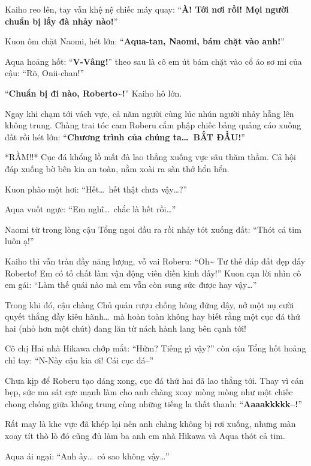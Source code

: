 \documentclass[../main.tex]{subfiles}
\begin{document}

Kaiho reo lên, tay vẫn khệ nệ chiếc máy quay: ``\textbf{À! Tới nơi rồi! Mọi người chuẩn bị lấy đà nhảy nào!}''

Kuon ôm chặt Naomi, hét lớn: ``\textbf{Aqua-tan, Naomi, bám chặt vào anh!}''

Aqua hoảng hốt: ``\textbf{V-Vâng!}'' theo sau là cô em út bám chặt vào cổ áo sơ mi của cậu: ``Rõ, Onii-chan!''

“\textbf{Chuẩn bị đi nào, Roberto\~{}!}” Kaiho hô lớn.

Ngay khi chạm tới vách vực, cả năm người cùng lúc nhún người nhảy hẫng lên không trung. Chàng trai tóc cam Roberu cắm phập chiếc bảng quảng cáo xuống đất rồi hét lớn: ``\textbf{Chương trình của chúng ta\dots\ BẮT ĐẦU!}''


*RẦM!!* Cục đá khổng lồ mất đà lao thẳng xuống vực sâu thăm thẳm. Cả hội đáp xuống bờ bên kia an toàn, nằm xoài ra sàn thở hổn hển.

Kuon phào một hơi: ``Hết\dots\ hết thật chưa vậy\dots?''

Aqua vuốt ngực: ``Em nghĩ\dots\ chắc là hết rồi\dots''

Naomi từ trong lòng cậu Tổng ngoi đầu ra rồi nhảy tót xuống đất: ``Thót cả tim luôn ạ!''

Kaiho thì vẫn tràn đầy năng lượng, vỗ vai Roberu: ``Oh\~{} Tư thế đáp đất đẹp đấy Roberto! Em có tố chất làm vận động viên điền kinh đấy!'' Kuon cạn lời nhìn cô em gái: ``Làm thế quái nào mà em vẫn còn sung sức được hay vậy\dots''

Trong khi đó, cậu chàng Chủ quán rượu chống hông đứng dậy, nở một nụ cười quyết thắng đầy kiêu hãnh\dots\ mà hoàn toàn không hay biết rằng một cục đá thứ hai (nhỏ hơn một chút) đang lăn từ nách hành lang bên cạnh tới!

Cô chị Hai nhà Hikawa chớp mắt: ``Hửm? Tiếng gì vậy?'' còn cậu Tổng hốt hoảng chỉ tay: ``N-Này cậu kia ơi! Cái cục đá--''

Chưa kịp để Roberu tạo dáng xong, cục đá thứ hai đã lao thẳng tới. Thay vì cán bẹp, sức ma sát cực mạnh làm cho anh chàng xoay mòng mòng như một chiếc chong chóng giữa không trung cùng những tiếng la thất thanh: ``\textbf{Aaaakkkkk--!}''


Rất may là khe vực đã khép lại nên anh chàng không bị rơi xuống, nhưng màn xoay tít thò lò đó cũng đủ làm ba anh em nhà Hikawa và Aqua thót cả tim.

Aqua ái ngại: ``Anh ấy\dots\ có sao không vậy\dots''
\end{document}
